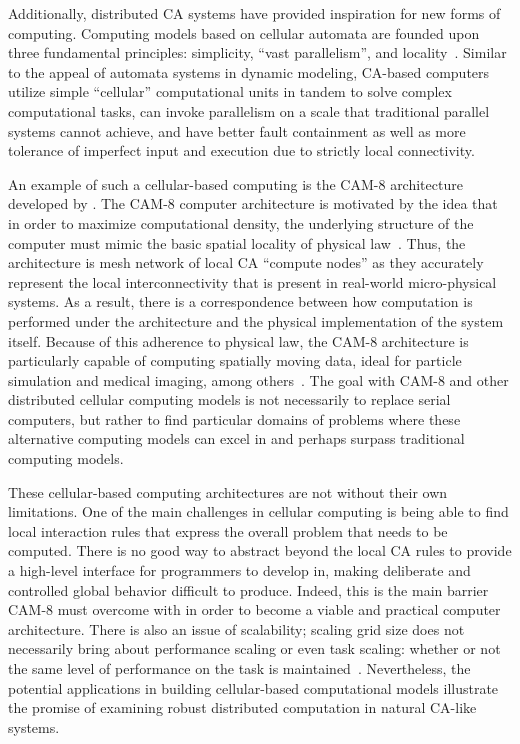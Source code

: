 \documentclass[a4paper,11pt]{report}
\begin{document}
Additionally, distributed CA systems have provided inspiration for new forms of computing. Computing models based on cellular automata are founded upon three fundamental principles: simplicity, ``vast parallelism'', and locality~\cite{si99}. Similar to the appeal of automata systems in dynamic modeling, CA-based computers utilize simple ``cellular'' computational units in tandem to solve complex computational tasks, can invoke parallelism on a scale that traditional parallel systems cannot achieve, and have better fault containment as well as more tolerance of imperfect input and execution due to strictly local connectivity.

An example of such a cellular-based computing is the CAM-8 architecture developed by \citeauthor{ma96}. The CAM-8 computer architecture is motivated by the idea that in order to maximize computational density, the underlying structure of the computer must mimic the basic spatial locality of physical law~\cite{ma96}. Thus, the architecture is mesh network of local CA ``compute nodes'' as they accurately represent the local interconnectivity that is present in real-world micro-physical systems. As a result, there is a correspondence between how computation is performed under the architecture and the physical implementation of the system itself. Because of this adherence to physical law, the CAM-8 architecture is particularly capable of computing spatially moving data, ideal for particle simulation and medical imaging, among others~\cite{ma96}. The goal with CAM-8 and other distributed cellular computing models is not necessarily to replace serial computers, but rather to find particular domains of problems where these alternative computing models can excel in and perhaps surpass traditional computing models.

These cellular-based computing architectures are not without their own limitations. One of the main challenges in cellular computing is being able to find local interaction rules that express the overall problem that needs to be computed. There is no good way to abstract beyond the local CA rules to provide a high-level interface for programmers to develop in, making deliberate and controlled global behavior difficult to produce. Indeed, this is the main barrier CAM-8 must overcome with in order to become a viable and practical computer architecture. There is also an issue of scalability; scaling grid size does not necessarily bring about performance scaling or even task scaling: whether or not the same level of performance on the task is maintained~\cite{si99}. Nevertheless, the potential applications in building cellular-based computational models illustrate the promise of examining robust distributed computation in natural CA-like systems.
\end{document}
